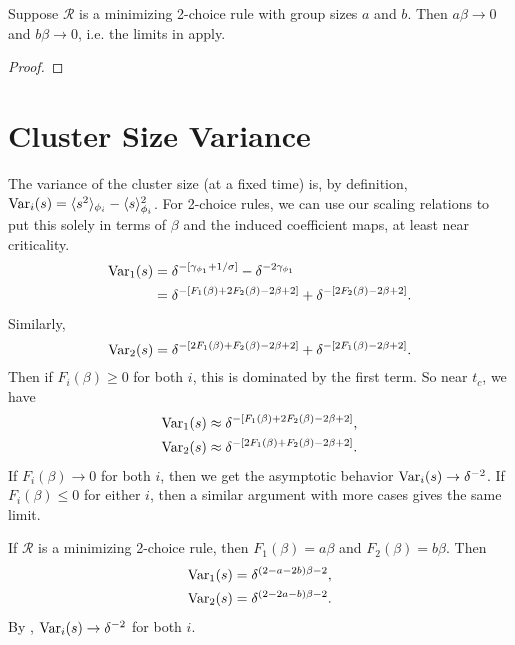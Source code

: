 \documentclass[twoside,10pt]{article}
\begin{document}
\begin{thrm}[]
	\label{m-beta-0}
	Suppose $\mathcal{R}$ is a minimizing 2-choice rule with group sizes $a$ and $b$. Then $a\beta \to 0$ and $b\beta\to 0$, i.e. the limits in  apply.
\end{thrm}
\begin{proof}
\end{proof}

\section{Cluster Size Variance}

The variance of the cluster size (at a fixed time) is, by definition, $\operatorname{Var}_i(s) = \langle s^2 \rangle_{\phi_i} - \langle s \rangle^2_{\phi_i}$. For 2-choice rules, we can use our scaling relations to put this solely in terms of $\beta$ and the induced coefficient maps, at least near criticality.
\begin{align*}
	\operatorname{Var}_1(s) &= \delta^{-[\gamma_{\phi_1} + 1/\sigma]} - \delta^{-2\gamma_{\phi_1}} \\
		  &= \delta^{-[F_1(\beta)+2F_2(\beta)-2\beta+2]} + \delta^{-[2F_2(\beta)-2\beta+2]}.
\end{align*}
Similarly,
\[
        \operatorname{Var}_2(s) = \delta^{-[2F_1(\beta)+F_2(\beta)-2\beta+2]} + \delta^{-[2F_1(\beta)-2\beta+2]}.
\]
Then if $F_i(\beta) \geq 0$ for both $i$, this is dominated by the first term. So near $t_c$, we have
\begin{align*}
	\operatorname{Var}_1(s) &\approx \delta^{-[F_1(\beta)+2F_2(\beta)-2\beta+2]}, \\
	\operatorname{Var}_2(s) &\approx \delta^{-[2F_1(\beta)+F_2(\beta)-2\beta+2]}.
\end{align*}
If $F_{i}(\beta)\to 0$ for both $i$, then we get the asymptotic behavior $\operatorname{Var}_i(s) \to \delta^{-2}$. If $F_{i}(\beta) \leq 0$ for either $i$, then a similar argument with more cases gives the same limit.

\begin{ex}[]
	If $\mathcal{R}$ is a minimizing 2-choice rule, then $F_1(\beta) = a \beta$ and $F_2(\beta)=b \beta$. Then
	\begin{align*}
		\operatorname{Var}_1(s) &= \delta^{(2-a-2b)\beta-2},\\
		\operatorname{Var}_2(s) &= \delta^{(2-2a-b)\beta-2}.
	\end{align*}
	By , $\operatorname{Var}_i(s) \to \delta^{-2}$ for both $i$.
\end{ex}
\end{document}
